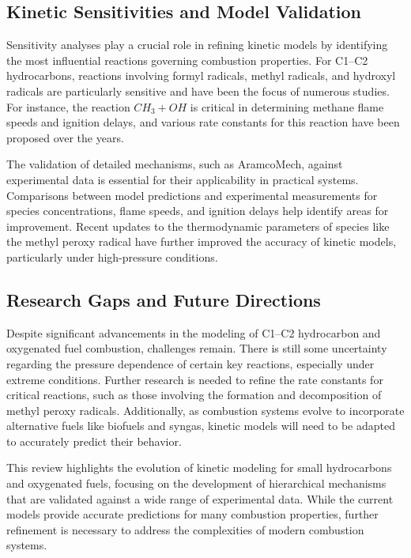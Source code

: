 \documentclass[12pt]{report}
\begin{document}
\subsection{Kinetic Sensitivities and Model Validation}
Sensitivity analyses play a crucial role in refining kinetic models by identifying the most influential reactions governing combustion properties. For C1–C2 hydrocarbons, reactions involving formyl radicals, methyl radicals, and hydroxyl radicals are particularly sensitive and have been the focus of numerous studies. For instance, the reaction \( CH_3 + OH \) is critical in determining methane flame speeds and ignition delays, and various rate constants for this reaction have been proposed over the years.

The validation of detailed mechanisms, such as AramcoMech, against experimental data is essential for their applicability in practical systems. Comparisons between model predictions and experimental measurements for species concentrations, flame speeds, and ignition delays help identify areas for improvement. Recent updates to the thermodynamic parameters of species like the methyl peroxy radical have further improved the accuracy of kinetic models, particularly under high-pressure conditions.

\subsection{Research Gaps and Future Directions}
Despite significant advancements in the modeling of C1–C2 hydrocarbon and oxygenated fuel combustion, challenges remain. There is still some uncertainty regarding the pressure dependence of certain key reactions, especially under extreme conditions. Further research is needed to refine the rate constants for critical reactions, such as those involving the formation and decomposition of methyl peroxy radicals. Additionally, as combustion systems evolve to incorporate alternative fuels like biofuels and syngas, kinetic models will need to be adapted to accurately predict their behavior.

\bigskip

This review highlights the evolution of kinetic modeling for small hydrocarbons and oxygenated fuels, focusing on the development of hierarchical mechanisms that are validated against a wide range of experimental data. While the current models provide accurate predictions for many combustion properties, further refinement is necessary to address the complexities of modern combustion systems.
\end{document}
